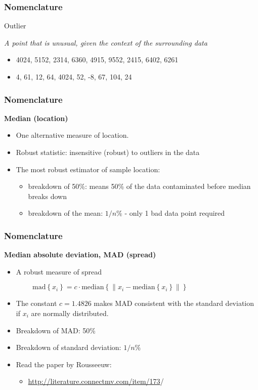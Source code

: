 \begin{frame}\frametitle{Nomenclature}
	\begin{block}
		{Outlier}
		\begin{center}
			\emph{A point that is unusual, given the context of the surrounding data}
		\end{center}
	\end{block}
	\begin{itemize}
		\item 4024, 5152, 2314, 6360, 4915, 9552, 2415, 6402, 6261
		\item 4, 61, 12, 64, 4024, 52, -8, 67, 104, 24
	\end{itemize}
\end{frame}

\begin{frame}\frametitle{Nomenclature}
	\textbf{Median (location)}
	\begin{itemize}
		\item One alternative measure of location.
		\item Robust statistic: insensitive (robust) to outliers in the data
		\item The most robust estimator of sample location:
		\begin{itemize}
			\item breakdown of 50\%: means 50\% of the data contaminated before median breaks down
			\item breakdown of the mean: $1/n$\% - only 1 bad data point required
		\end{itemize}
	\end{itemize}
\end{frame}

\begin{frame}\frametitle{Nomenclature}
	\textbf{Median absolute deviation, MAD (spread)}
	\begin{itemize}
		\item A robust measure of spread
	\end{itemize}
	$ \qquad\qquad \text{mad}\left\{ x_i \right\} = c \cdot \text{median}\left\{ \| x_i - \text{median}\left\{ x_i \right\} \| \right\} $
	\begin{itemize}
		\item The constant $c = 1.4826$ makes MAD consistent with the standard deviation if $x_i$ are normally distributed.
		\item Breakdown of MAD: 50\%
		\item Breakdown of standard deviation: $1/n$\%
	\end{itemize}
	\begin{itemize}
		\item Read the paper by Rousseeuw:
		\begin{itemize}
			\item \href{http://literature.connectmv.com/item/173}{http://literature.connectmv.com/item/173}/
		\end{itemize}
	\end{itemize}
\end{frame}

